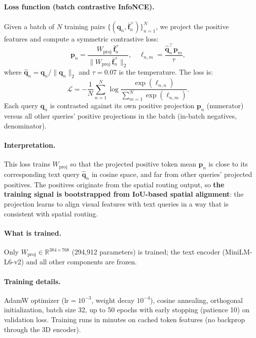 \documentclass[11pt,a4paper]{article}
\newcommand{\RR}{\mathbb{R}}
\begin{document}
\paragraph{Loss function (batch contrastive InfoNCE).}
Given a batch of $N$ training pairs $\{(\mathbf{q}_n, \bar{\mathbf{f}}_n^{+})\}_{n=1}^N$, we project the positive features and compute a symmetric contrastive loss:
\begin{equation}
\mathbf{p}_n = \frac{W_{\mathrm{proj}} \, \bar{\mathbf{f}}_n^{+}}{\lVert W_{\mathrm{proj}} \, \bar{\mathbf{f}}_n^{+} \rVert_2}, \quad
\ell_{n,m} = \frac{\hat{\mathbf{q}}_n^\top \mathbf{p}_m}{\tau},
\label{eq:infonce_logits}
\end{equation}
where $\hat{\mathbf{q}}_n = \mathbf{q}_n / \lVert \mathbf{q}_n \rVert_2$ and $\tau = 0.07$ is the temperature.
The loss is:
\begin{equation}
\mathcal{L} = -\frac{1}{N} \sum_{n=1}^{N} \log \frac{\exp(\ell_{n,n})}{\sum_{m=1}^{N} \exp(\ell_{n,m})}.
\label{eq:infonce}
\end{equation}
Each query $\mathbf{q}_n$ is contrasted against its own positive projection $\mathbf{p}_n$ (numerator) versus all other queries' positive projections in the batch (in-batch negatives, denominator).

\paragraph{Interpretation.}
This loss trains $W_{\mathrm{proj}}$ so that the projected positive token mean $\mathbf{p}_n$ is close to its corresponding text query $\hat{\mathbf{q}}_n$ in cosine space, and far from other queries' projected positives.
The positives originate from the spatial routing output, so \textbf{the training signal is bootstrapped from IoU-based spatial alignment}: the projection learns to align visual features with text queries in a way that is consistent with spatial routing.

\paragraph{What is trained.}
Only $W_{\mathrm{proj}} \in \RR^{384 \times 768}$ (294,912 parameters) is trained; the text encoder (MiniLM-L6-v2) and all other components are frozen.

\paragraph{Training details.}
AdamW optimizer ($\mathrm{lr}{=}10^{-3}$, weight decay $10^{-4}$), cosine annealing, orthogonal initialization, batch size 32, up to 50 epochs with early stopping (patience 10) on validation loss.
Training runs in minutes on cached token features (no backprop through the 3D encoder).
\end{document}
